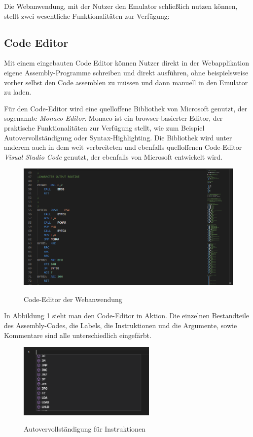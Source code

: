 Die Webanwendung, mit der Nutzer den Emulator schließlich nutzen können, stellt zwei wesentliche Funktionalitäten zur Verfügung:

\subsection{Code Editor}

Mit einem eingebauten Code Editor können Nutzer direkt in der Webapplikation eigene Assembly-Programme schreiben und direkt ausführen, ohne beispielsweise vorher selbst den Code assemblen zu müssen und dann manuell in den Emulator zu laden.

Für den Code-Editor wird eine quelloffene Bibliothek von Microsoft genutzt, der sogenannte \textit{Monaco Editor}. Monaco ist ein browser-basierter Editor, der praktische Funktionalitäten zur Verfügung stellt, wie zum Beispiel Autovervollständigung oder Syntax-Highlighting. Die Bibliothek wird unter anderem auch in dem weit verbreiteten und ebenfalls quelloffenen Code-Editor \textit{Visual Studio Code} genutzt, der ebenfalls von Microsoft entwickelt wird.

\begin{figure}
    \caption{Code-Editor der Webanwendung}
    \centering
    \includegraphics[width=1.0\textwidth]{Bilder/CodeEditor.png}
    \label{fig:codeeditor}
\end{figure}

In Abbildung \ref{fig:codeeditor} sieht man den Code-Editor in Aktion. Die einzelnen Bestandteile des Assembly-Codes, die Labels, die Instruktionen und die Argumente, sowie Kommentare sind alle unterschiedlich eingefärbt.

\begin{figure}
    \caption{Autovervollständigung für Instruktionen}
    \centering
    \includegraphics[width=0.6\textwidth]{Bilder/Completion1.png}
    \label{fig:completion1}
\end{figure}

